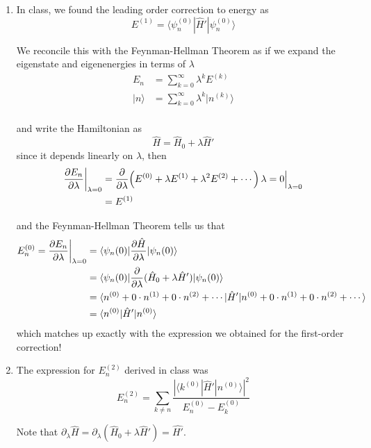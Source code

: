 \documentclass{article}
\newcommand{\ket}[1]{|#1 \rangle}
\newcommand{\inner}[2]{\langle #1 | #2 \rangle}
\newcommand{\restr}[2]{{%
  \left.\kern-\nulldelimiterspace %
  #1 %
  \vphantom{\big|} %
  \right|_{#2} %
  }}
\begin{document}
\begin{enumerate}[label=(\alph*)]
  \vskip 0.5cm
  \item In class, we found the leading order correction to energy as 
  \[ E^{(1)} = \inner{\psi_n^{(0)}}{\hat{H}'|\psi_n^{(0)}} \]

  We reconcile this with the Feynman-Hellman Theorem as if we expand the eigenstate and eigenenergies in terms of $\lambda$
  \begin{align*}
    E_n &= \sum_{k = 0}^{\infty} \lambda^k E^{(k)} \\
    \ket{n} &= \sum_{k = 0}^{\infty} \lambda^k \ket{n^{(k)}} \\
  \end{align*}

  and write the Hamiltonian as 
  \[ \hat{H} = \hat{H}_0 + \lambda \hat{H}' \]
  since it depends linearly on $\lambda$, then 
  \begin{align*}
    \restr{\frac{\partial E_n}{\partial \lambda}}{\lambda = 0} &= \frac{\partial}{\partial \lambda} \restr{\left( E^{(0)} + \lambda E^{(1)} + \lambda^2 E^{(2)} + \cdots \right){\lambda = 0}}{\lambda = 0} \\
    &= E^{(1)}
  \end{align*}

  and the Feynman-Hellman Theorem tells us that 
  \begin{align*}
    E_n^{(0)} = \restr{\frac{\partial E_n}{\partial \lambda}}{\lambda = 0} &= \inner{\psi_n(0)}{\frac{\partial \hat{H}}{\partial \lambda}|\psi_n(0)} \\
    &= \inner{\psi_n(0)}{\frac{\partial }{\partial \lambda} (\hat{H}_0 + \lambda \hat{H}')|\psi_n(0)} \\
    &= \inner{n^{(0)} + 0 \cdot n^{(1)} + 0 \cdot n^{(2)} + \cdots }{\hat{H}'| n^{(0)} + 0 \cdot n^{(1)} + 0 \cdot n^{(2)} + \cdots} \\
    &= \inner{n^{(0)}}{ \hat{H}' | n^{(0)}}
  \end{align*}
  which matches up exactly with the expression we obtained for the first-order correction!
  
  \vskip 0.5cm
  \item The expression for $E_n^{(2)}$ derived in class was 
  \[ E_n^{(2)} = \sum_{k \neq n} \frac{\left|\inner{k^{(0)}}{\hat{H}'|n^{(0)}}\right|^2}{E_n^{(0)} - E_k^{(0)}} \]

  Note that $\partial_{\lambda} \hat{H} = \partial_{\lambda} \left( \hat{H}_0 + \lambda \hat{H}' \right) = \hat{H'}$.


\end{enumerate}
\end{document}

